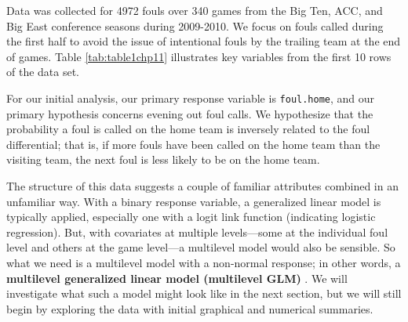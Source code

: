 \documentclass[
]{krantz}
\begin{document}
Data was collected for 4972 fouls over 340 games from the Big Ten, ACC, and Big East conference seasons during 2009-2010. We focus on fouls called during the first half to avoid the issue of intentional fouls by the trailing team at the end of games. Table \ref{tab:table1chp11} illustrates key variables from the first 10 rows of the data set.

\begin{table}

\caption{\label{tab:table1chp11}Key variables from the first 10 rows of data from the College Basketball Referees case study.  Each row represents a different foul called; we see all 8 first-half fouls from Game 1 followed by the first 2 fouls called in Game 2.}
\centering
{}
\end{table}

For our initial analysis, our primary response variable is \texttt{foul.home}, and our primary hypothesis concerns evening out foul calls. We hypothesize that the probability a foul is called on the home team is inversely related to the foul differential; that is, if more fouls have been called on the home team than the visiting team, the next foul is less likely to be on the home team.

The structure of this data suggests a couple of familiar attributes combined in an unfamiliar way. With a binary response variable, a generalized linear model is typically applied, especially one with a logit link function (indicating logistic regression). But, with covariates at multiple levels---some at the individual foul level and others at the game level---a multilevel model would also be sensible. So what we need is a multilevel model with a non-normal response; in other words, a \textbf{multilevel generalized linear model (multilevel GLM)} . We will investigate what such a model might look like in the next section, but we will still begin by exploring the data with initial graphical and numerical summaries.
\end{document}
